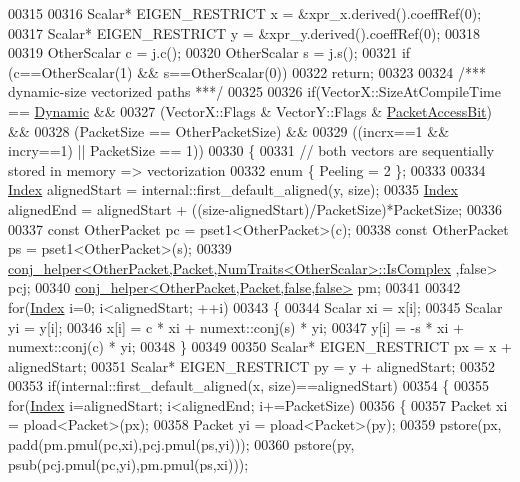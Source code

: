\begin{DoxyCode}
00315 
00316   Scalar* EIGEN\_RESTRICT x = &xpr\_x.derived().coeffRef(0);
00317   Scalar* EIGEN\_RESTRICT y = &xpr\_y.derived().coeffRef(0);
00318   
00319   OtherScalar c = j.c();
00320   OtherScalar s = j.s();
00321   \textcolor{keywordflow}{if} (c==OtherScalar(1) && s==OtherScalar(0))
00322     \textcolor{keywordflow}{return};
00323 
00324   \textcolor{comment}{/*** dynamic-size vectorized paths ***/}
00325 
00326   \textcolor{keywordflow}{if}(VectorX::SizeAtCompileTime == \hyperlink{namespace_eigen_ad81fa7195215a0ce30017dfac309f0b2}{Dynamic} &&
00327     (VectorX::Flags & VectorY::Flags & \hyperlink{group__flags_ga1a306a438e1ab074e8be59512e887b9f}{PacketAccessBit}) &&
00328     (PacketSize == OtherPacketSize) &&
00329     ((incrx==1 && incry==1) || PacketSize == 1))
00330   \{
00331     \textcolor{comment}{// both vectors are sequentially stored in memory => vectorization}
00332     \textcolor{keyword}{enum} \{ Peeling = 2 \};
00333 
00334     \hyperlink{namespace_eigen_a62e77e0933482dafde8fe197d9a2cfde}{Index} alignedStart = internal::first\_default\_aligned(y, size);
00335     \hyperlink{namespace_eigen_a62e77e0933482dafde8fe197d9a2cfde}{Index} alignedEnd = alignedStart + ((size-alignedStart)/PacketSize)*PacketSize;
00336 
00337     \textcolor{keyword}{const} OtherPacket pc = pset1<OtherPacket>(c);
00338     \textcolor{keyword}{const} OtherPacket ps = pset1<OtherPacket>(s);
00339     \hyperlink{struct_eigen_1_1internal_1_1conj__helper}{conj\_helper<OtherPacket,Packet,NumTraits<OtherScalar>::IsComplex}
      ,\textcolor{keyword}{false}> pcj;
00340     \hyperlink{struct_eigen_1_1internal_1_1conj__helper}{conj\_helper<OtherPacket,Packet,false,false>} pm;
00341 
00342     \textcolor{keywordflow}{for}(\hyperlink{namespace_eigen_a62e77e0933482dafde8fe197d9a2cfde}{Index} i=0; i<alignedStart; ++i)
00343     \{
00344       Scalar xi = x[i];
00345       Scalar yi = y[i];
00346       x[i] =  c * xi + numext::conj(s) * yi;
00347       y[i] = -s * xi + numext::conj(c) * yi;
00348     \}
00349 
00350     Scalar* EIGEN\_RESTRICT px = x + alignedStart;
00351     Scalar* EIGEN\_RESTRICT py = y + alignedStart;
00352 
00353     \textcolor{keywordflow}{if}(internal::first\_default\_aligned(x, size)==alignedStart)
00354     \{
00355       \textcolor{keywordflow}{for}(\hyperlink{namespace_eigen_a62e77e0933482dafde8fe197d9a2cfde}{Index} i=alignedStart; i<alignedEnd; i+=PacketSize)
00356       \{
00357         Packet xi = pload<Packet>(px);
00358         Packet yi = pload<Packet>(py);
00359         pstore(px, padd(pm.pmul(pc,xi),pcj.pmul(ps,yi)));
00360         pstore(py, psub(pcj.pmul(pc,yi),pm.pmul(ps,xi)));

\end{DoxyCode}
